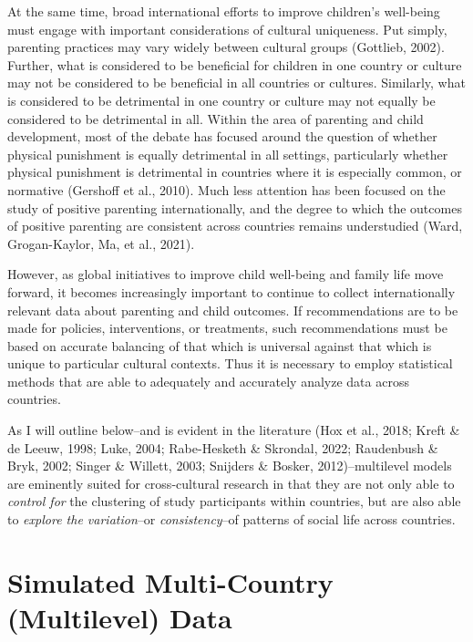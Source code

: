 \documentclass[
  letterpaper,
  DIV=11,
  numbers=noendperiod]{scrreprt}
\begin{document}
At the same time, broad international efforts to improve children's
well-being must engage with important considerations of cultural
uniqueness. Put simply, parenting practices may vary widely between
cultural groups (Gottlieb, 2002). Further, what is considered to be
beneficial for children in one country or culture may not be considered
to be beneficial in all countries or cultures. Similarly, what is
considered to be detrimental in one country or culture may not equally
be considered to be detrimental in all. Within the area of parenting and
child development, most of the debate has focused around the question of
whether physical punishment is equally detrimental in all settings,
particularly whether physical punishment is detrimental in countries
where it is especially common, or normative (Gershoff et al., 2010).
Much less attention has been focused on the study of positive parenting
internationally, and the degree to which the outcomes of positive
parenting are consistent across countries remains understudied (Ward,
Grogan-Kaylor, Ma, et al., 2021).

However, as global initiatives to improve child well-being and family
life move forward, it becomes increasingly important to continue to
collect internationally relevant data about parenting and child
outcomes. If recommendations are to be made for policies, interventions,
or treatments, such recommendations must be based on accurate balancing
of that which is universal against that which is unique to particular
cultural contexts. Thus it is necessary to employ statistical methods
that are able to adequately and accurately analyze data across
countries.

As I will outline below--and is evident in the literature (Hox et al.,
2018; Kreft \& de Leeuw, 1998; Luke, 2004; Rabe-Hesketh \& Skrondal,
2022; Raudenbush \& Bryk, 2002; Singer \& Willett, 2003; Snijders \&
Bosker, 2012)--multilevel models are eminently suited for cross-cultural
research in that they are not only able to \emph{control for} the
clustering of study participants within countries, but are also able to
\emph{explore the variation}--or \emph{consistency}--of patterns of
social life across countries.


\chapter{Simulated Multi-Country (Multilevel)
Data}\label{sec-simulateddata}
\end{document}
